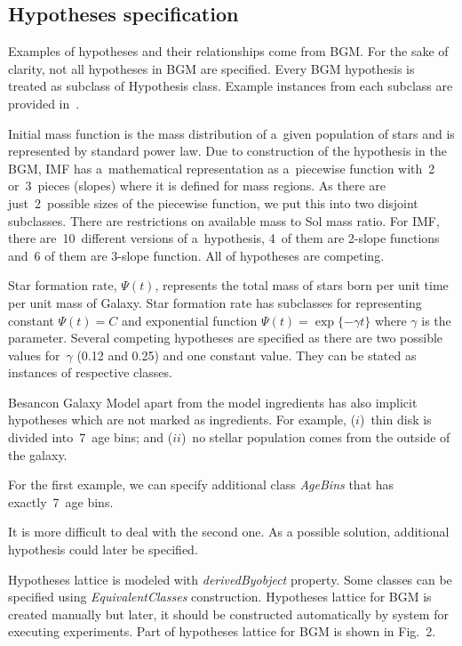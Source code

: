 \begin{multicols}{2}
\vspace*{-12pt}

\subsection{Hypotheses specification}

\vspace*{-4pt}

      \noindent
      Examples of hypotheses and their relationships come from BGM. For the 
sake of clarity, not all hypotheses in BGM are specified. Every BGM hypothesis is 
treated as subclass of Hypothesis class. Example instances from each subclass are 
provided in~\cite{3-tar}.
      
      Initial mass function is the mass distribution of a~given population of stars 
and is represented by standard power law. Due to construction of the hypothesis in 
the BGM, IMF has a~mathematical representation as a~piecewise function with~2 
or~3~pieces (slopes) where it is defined for mass regions. As there are just~2~possible 
sizes of the piecewise function, we put this into two disjoint subclasses. There are 
restrictions on available mass to Sol mass ratio. For IMF, there are~10~different 
versions of a~hypothesis, 4~of them are 2-slope functions and~6 of them are 3-slope 
function. All of hypotheses are competing. 
      
      Star formation rate, $\Psi(t)$, represents the total mass of stars born per unit 
time per unit mass of Galaxy. Star formation rate has subclasses for representing 
constant $\Psi(t)=C$ and exponential function $\Psi(t)=\exp \{ -\gamma t\}$ where 
$\gamma$ is the parameter. Several competing hypotheses are specified as there are 
two possible values for~$\gamma$ (0.12 and 0.25) and one constant value. They can be 
stated as instances of respective classes. 
      
     Besancon Galaxy
Model apart from the model ingredients has also implicit hypotheses which are 
not marked as ingredients. For example, ($i$)~thin disk is divided into~7~age bins; and
($ii$)~no stellar population comes from the outside of the galaxy. 

For the first example, 
we can specify additional class \textit{AgeBins} that has exactly~7~age bins. 
      
      It is more difficult to deal with the second one. As a possible solution, 
additional hypothesis could later be specified.
      
      Hypotheses lattice is modeled with \textit{derivedByobject} property. Some 
classes can be specified using \textit{EquivalentClasses} construction. Hypotheses 
lattice for BGM is created manually but later, it should be constructed automatically 
by system for executing experiments. Part of hypotheses lattice for BGM is shown 
in Fig.~2. 
      

\end{multicols}
